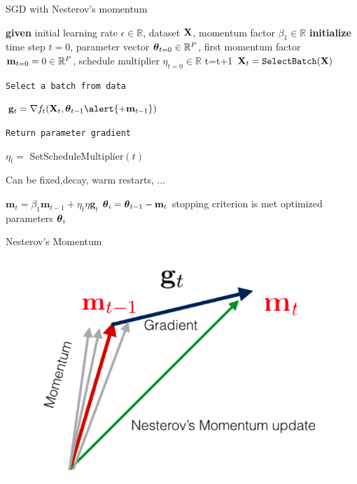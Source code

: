 \documentclass[xcolor=pdftex,dvipsnames,table,mathserif]{beamer}
\begin{document}
\begin{frame}{SGD with Nesterov's momentum \cite{Nesterov83}}
\begin{algorithm}[H]
\begin{algorithmic}[1]
\STATE \textbf{given} initial learning rate $\epsilon \in \mathbb{R}$, dataset $\mathbf{X}$, momentum factor $\beta_1 \in \mathbb{R}$
\STATE \textbf{initialize} time step $t=0$, parameter vector $\boldsymbol{\theta}_{t=0} \in \mathbb{R}^P$, first momentum factor $\mathbf{m}_{t=0}=0 \in \mathbb{R}^P$, schedule multiplier $\eta_{t=0} \in \mathbb{R}$
\REPEAT
\STATE t=t+1
\STATE $\mathbf{X}_t=\texttt{SelectBatch} (\mathbf{X})$ \begin{tiny}\texttt{Select a batch from data} \end{tiny}
\STATE $\mathbf{g}_t = \nabla f_t(\X_t,\param_{t-1}\alert{+\mathbf{m}_{t-1}})$ \begin{tiny}\texttt{Return parameter gradient} \end{tiny}
\STATE $\eta_t = $ SetScheduleMultiplier$(t)$ \begin{tiny}{Can be fixed,decay, warm restarts, ...}\end{tiny}
\STATE $\mathbf{m}_t = \beta_1 \mathbf{m}_{t-1} + \eta_{t} \eta  \mathbf{g}_t $
\STATE $\boldsymbol{\theta}_i=\boldsymbol{\theta}_{t-1} - \mathbf{m}_{t}$
\UNTIL stopping criterion is met
\RETURN optimized parameters $\boldsymbol{\theta}_i$
\end{algorithmic}
\caption{pseudocode for stochastic gradient descent \alert{with Momentum} }
\label{alg:seq}
\end{algorithm}
\end{frame}

\begin{frame}{Nesterov's Momentum}
\begin{figure}
\includegraphics[width=.95\columnwidth]{../graphics/Nesterov}
\end{figure}
\end{frame}
\end{document}
